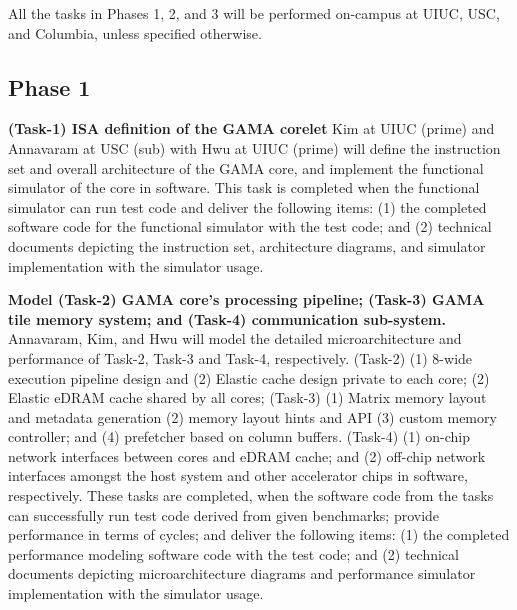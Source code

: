 \noindent
All the tasks in Phases 1, 2, and 3 will be performed on-campus at UIUC, USC, and Columbia, unless specified otherwise.

\subsection{Phase 1}
\noindent
\textbf{(Task-1) ISA definition of the GAMA corelet} 
Kim at UIUC (prime) and Annavaram at USC (sub) with Hwu at UIUC (prime) will define the instruction set and overall architecture of the GAMA core, and implement the functional simulator of the core in software.
This task is completed when the functional simulator can run test code and deliver the following items: 
(1) the completed software code for the functional simulator with the test code; and (2) technical documents depicting the instruction set, architecture diagrams, and simulator implementation with the simulator usage.


\vspace{3pt}
\noindent
\textbf{Model (Task-2) GAMA core's processing pipeline; (Task-3) GAMA tile memory system; and (Task-4) communication sub-system.}
Annavaram, Kim, and Hwu will model the detailed microarchitecture and performance of Task-2, Task-3 and Task-4, respectively.  
(Task-2) (1) 8-wide execution pipeline design and (2) Elastic cache design private to each core; (2) Elastic eDRAM cache shared by all cores; 
(Task-3) (1) Matrix memory layout and metadata generation (2) memory layout hints and API (3) custom memory controller; and (4)  prefetcher based on column buffers.
(Task-4) (1) on-chip network interfaces between cores and eDRAM cache; and (2) off-chip network interfaces amongst the host system and other accelerator chips in software, respectively.
These tasks are completed, when the software code from the tasks can successfully run test code derived from given benchmarks; provide performance in terms of cycles; and deliver the following items:
(1) the completed performance modeling software code with the test code; and (2) technical documents depicting microarchitecture diagrams and performance simulator implementation with the simulator usage.


